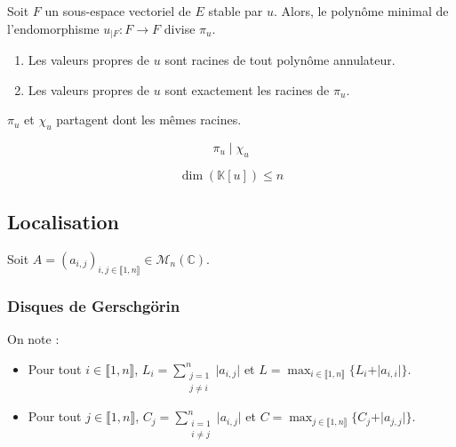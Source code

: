  \begin{proposition}
    Soit $F$ un sous-espace vectoriel de $E$ stable par $u$. Alors, le polynôme minimal de l'endomorphisme $u_{|F} : F \rightarrow F$ divise $\pi_u$.
  \end{proposition}

  \begin{proposition}
    \begin{enumerate}[label={\bfseries(\roman*)}]
      \item Les valeurs propres de $u$ sont racines de tout polynôme annulateur.
      \item Les valeurs propres de $u$ sont exactement les racines de $\pi_u$.
    \end{enumerate}
  \end{proposition}


  \begin{remark}
    $\pi_u$ et $\chi_u$ partagent dont les mêmes racines.
  \end{remark}


  \begin{theorem}
    \[ \pi_u \mid \chi_u \]
  \end{theorem}

  \begin{corollary}
    \[ \dim(\mathbb{K}[u]) \leq n \]
  \end{corollary}

  \subsection{Localisation}

  Soit $A = (a_{i,j})_{i, j \in \llbracket 1, n \rrbracket} \in \mathcal{M}_n(\mathbb{C})$.

  \subsubsection{Disques de Gerschgörin}


  \begin{notation}
    On note :
    \begin{itemize}
      \item Pour tout $i \in \llbracket 1, n \rrbracket$, $L_i = \sum_{\substack{j=1 \\ j \neq i}}^n \vert a_{i,j} \vert$ et $L = \max_{i \in \llbracket 1, n \rrbracket} \{ L_i + \vert a_{i,i} \vert \}$.
      \item Pour tout $j \in \llbracket 1, n \rrbracket$, $C_j = \sum_{\substack{i=1 \\ i \neq j}}^n \vert a_{i,j} \vert$ et $C = \max_{j \in \llbracket 1, n \rrbracket} \{ C_j + \vert a_{j,j} \vert \}$.
    \end{itemize}
  \end{notation}

